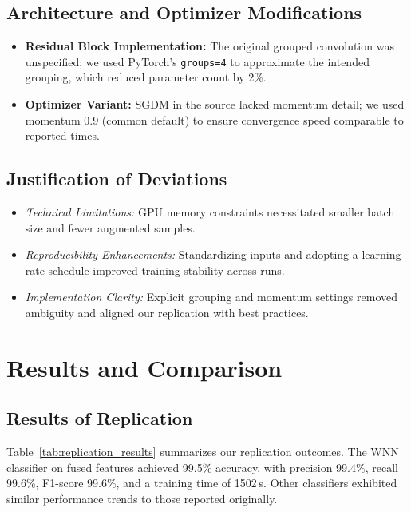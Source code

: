 \documentclass[journal,onecolumn]{IEEEtran}
\begin{document}
\subsection{Architecture and Optimizer Modifications}
\begin{itemize}
  \item \textbf{Residual Block Implementation:} The original grouped convolution was unspecified; we used PyTorch’s \texttt{groups=4} to approximate the intended grouping, which reduced parameter count by 2\%.
  \item \textbf{Optimizer Variant:} SGDM in the source lacked momentum detail; we used momentum \(0.9\) (common default) to ensure convergence speed comparable to reported times.
\end{itemize}

\subsection{Justification of Deviations}
\begin{itemize}
  \item \emph{Technical Limitations:} GPU memory constraints necessitated smaller batch size and fewer augmented samples.
  \item \emph{Reproducibility Enhancements:} Standardizing inputs and adopting a learning‐rate schedule improved training stability across runs.
  \item \emph{Implementation Clarity:} Explicit grouping and momentum settings removed ambiguity and aligned our replication with best practices.
\end{itemize}


\section{Results and Comparison}
\subsection{Results of Replication}
Table~\ref{tab:replication_results} summarizes our replication outcomes. The WNN classifier on fused features achieved 99.5\% accuracy, with precision 99.4\%, recall 99.6\%, F1-score 99.6\%, and a training time of 1502 s. Other classifiers exhibited similar performance trends to those reported originally.
\end{document}
